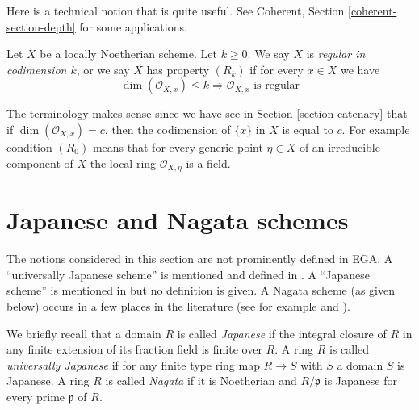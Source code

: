 \noindent
Here is a technical notion that is quite useful.
See Coherent, Section \ref{coherent-section-depth} for some applications.

\begin{definition}
\label{definition-Rk}
Let $X$ be a locally Noetherian scheme.
Let $k \geq 0$. We say $X$ is {\it regular in codimension $k$},
or we say $X$ has property {\it $(R_k)$} if for every $x \in X$
we have
$$
\dim(\mathcal{O}_{X, x}) \leq k
\Rightarrow
\mathcal{O}_{X, x}\text{ is regular}
$$
\end{definition}

\noindent
The terminology makes sense since we have see in Section \ref{section-catenary}
that if $\dim(\mathcal{O}_{X, x}) = c$, then the codimension
of $\overline{\{x\}}$ in $X$ is equal to $c$. For example condition
$(R_0)$ means that for every generic point $\eta \in X$ of an irreducible
component of $X$ the local ring $\mathcal{O}_{X, \eta}$ is a field.







\section{Japanese and Nagata schemes}
\label{section-nagata}

\noindent
The notions considered in this section are not prominently defined in EGA.
A ``universally Japanese scheme'' is mentioned and defined in
\cite[IV Corollary 5.11.4]{EGA}. A ``Japanese scheme'' is mentioned in
\cite[IV Remark 10.4.14 (ii)]{EGA} but no definition is given.
A Nagata scheme (as given below) occurs in a few
places in the literature (see for example \cite[Definition 8.2.30]{Liu} and
\cite[Page 142]{Greco}).

\medskip\noindent
We briefly recall that a domain $R$ is called {\it Japanese} if the integral
closure of $R$ in any finite extension of its fraction field is finite over
$R$. A ring $R$ is called {\it universally Japanese} if for any finite type
ring map $R \to S$ with $S$ a domain $S$ is Japanese. A ring $R$ is called
{\it Nagata} if it is Noetherian and $R/\mathfrak p$ is Japanese for every
prime $\mathfrak p$ of $R$.

